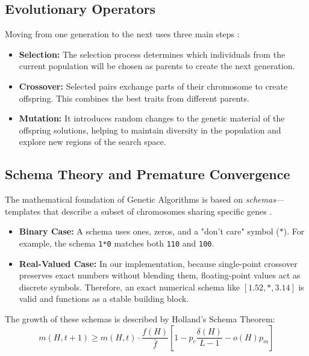 \documentclass[conference]{IEEEtran}
\begin{document}
    \subsection{Evolutionary Operators}
    Moving from one generation to the next uses three main steps \cite{b1}:
    \begin{itemize}
        \item \textbf{Selection:} The selection process determines which individuals from the current population will be chosen as parents to create the next generation.
        \item \textbf{Crossover:} Selected pairs exchange parts of their chromosome to create offspring. This combines the best traits from different parents.
        \item \textbf{Mutation:} It introduces random changes to the genetic material of the offspring solutions, helping to maintain diversity in the population and explore new regions of the search space.
    \end{itemize}

    \subsection{Schema Theory and Premature Convergence}
        The mathematical foundation of Genetic Algorithms is based on \textit{schemas}---templates that describe a subset of chromosomes sharing specific genes \cite{b2, b3}.

        \begin{itemize}
            \item \textbf{Binary Case:} A schema uses ones, zeros, and a "don't care" symbol ($*$). For example, the schema \texttt{1*0} matches both \texttt{110} and \texttt{100}.
            \item \textbf{Real-Valued Case:} In our implementation, because single-point crossover preserves exact numbers without blending them, floating-point values act as discrete symbols. Therefore, an exact numerical schema like $[1.52, *, 3.14]$ is valid and functions as a stable building block.
        \end{itemize}

        The growth of these schemas is described by Holland's Schema Theorem:
        \begin{equation}
            m(H, t+1) \ge m(H, t) \cdot \frac{f(H)}{\bar{f}} \left[ 1 - p_c \frac{\delta(H)}{L-1} - o(H)p_m \right]
        \end{equation}
\end{document}
